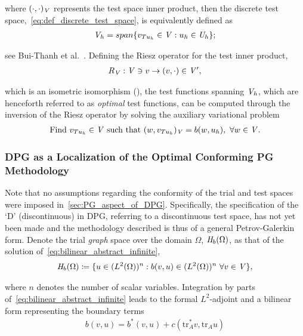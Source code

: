 where $(\cdot,\cdot)_{\mathit{{{V}}}}$ represents the test space inner product, then the discrete test
space,~\eqref{eq:def_discrete_test_space}, is equivalently defined as
\begin{align} \label{eq:def_discrete_test_space_alt}
\mathit{{{V}}}_h = span \{ v_{T u_h} \in \mathit{{{V}}} : u_h \in \mathit{{{U}}}_h \};
\end{align}

see Bui-Thanh et al.~\cite[Theorem ]{BuiThanh2013}. Defining the Riesz operator for the test inner
product,
\begin{align}
R_{\mathit{{{V}}}} : \mathit{{{V}}} \ni v \rightarrow (v,\cdot) \in \mathit{{{V}}}',
\end{align}

which is an isometric isomorphism (\cite[Theorem ]{Ciarlet2013}), the test functions
spanning $\mathit{{{V}}}_h$, which are henceforth referred to as \emph{optimal} test
functions, can be computed through the inversion of the Riesz operator by solving the auxiliary variational problem
\begin{align} \label{eq:auxiliary_opt_v}
\text{Find}\ v_{T u_h} \in \mathit{{{V}}}\ \text{such that}\
(w,v_{T u_h})_{\mathit{{{V}}}} = b(w,u_h),\ \forall w \in \mathit{{{V}}}.
\end{align}

\subsubsection{DPG as a Localization of the Optimal Conforming PG Methodology} \label{sec:dpg_abstract_setting}

Note that no assumptions regarding the conformity of the trial and test spaces were imposed
in~\autoref{sec:PG_aspect_of_DPG}. Specifically, the specification of the `D' (discontinuous) in DPG, referring to a
discontinuous test space, has not yet been made and the methodology described is thus of a general Petrov-Galerkin
form. Denote the trial \emph{graph} space over the domain $\Omega$, $\mathit{{{H}}}_b(\Omega)$, as that of the solution
of~\eqref{eq:bilinear_abstract_infinite},
\begin{align}
\mathit{{{H}}}_b(\Omega) \coloneqq
\{ u \in (L^2(\Omega))^n : b(v,u) \in (L^2(\Omega))^n\ \forall v \in \mathit{{{V}}} \},
\end{align}

where $n$ denotes the number of scalar variables. Integration by parts of~\eqref{eq:bilinear_abstract_infinite} leads to
the formal $L^2$-adjoint and a bilinear form representing the boundary terms
\begin{align}
b(v,u) = b^*(v,u) + c(\text{tr}_A^* v, \text{tr}_A u)
\end{align}


